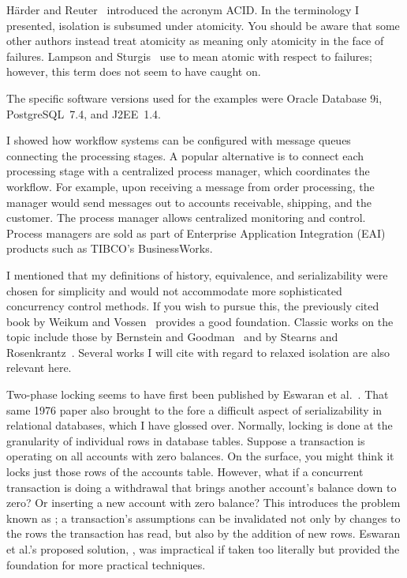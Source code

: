 H{\"a}rder and Reuter~\cite{max1001} introduced the acronym ACID.  In the
terminology I presented, isolation is subsumed under atomicity.  You
should be aware that some other authors instead treat atomicity as
meaning only atomicity in the face of failures.  Lampson and Sturgis~\cite{max1050}
use  to mean atomic with respect to failures; however,
this term does not seem to have caught on.

The specific
software versions used for the examples were Oracle Database 9i,
PostgreSQL~7.4, and J2EE~1.4.

I showed how workflow systems can be configured with message queues connecting the processing stages. A popular alternative is to connect each processing stage with a centralized process manager, which coordinates the workflow. For example,
upon receiving a message from order processing, the manager would send messages out to accounts receivable, shipping, and the customer. The process manager allows centralized monitoring and control. Process managers are sold as part of Enterprise Application Integration (EAI) products such as TIBCO's BusinessWorks.

I mentioned that my definitions of history, equivalence, and
serializability were chosen for simplicity and would not accommodate
more sophisticated concurrency control methods.  If you wish to pursue
this, the previously cited book by Weikum and
Vossen~\cite{max1085} provides a good
foundation.  Classic works on the topic include those by Bernstein and
Goodman~\cite{max1003,max1013} and by Stearns and Rosenkrantz~\cite{max1014}.  Several works I will cite with regard
to relaxed isolation are also relevant here.

Two-phase locking seems to have first been published by
Eswaran et
al.~\cite{max1005}.  That same 1976 paper also brought to the fore a
difficult aspect of serializability in relational databases, which I
have glossed over.  Normally, locking is done at the granularity of
individual rows in database tables.  Suppose a transaction is
operating on all accounts with zero balances.  On the surface, you
might think it locks just those rows of the accounts table.  However, what
if a concurrent transaction is doing a withdrawal that brings another
account's balance down to zero?  Or inserting a new account with zero
balance?  This introduces the problem known as ; a
transaction's assumptions can be invalidated not only by changes to
the rows the transaction has read, but also by the addition of new
rows.
Eswaran et al.'s proposed solution,
, was impractical if taken too literally
but provided the foundation for more practical techniques.

